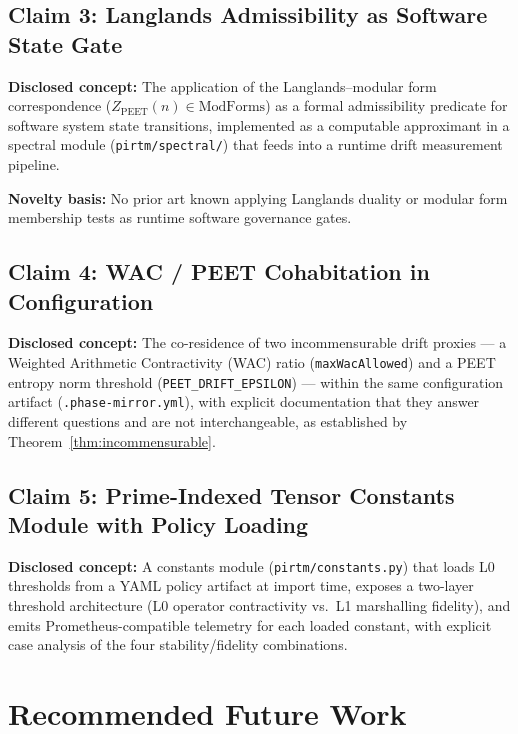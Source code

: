 \documentclass[11pt,letterpaper]{article}
\theoremstyle{definition}
\theoremstyle{remark}
\newcommand{\peet}{\mathrm{PEET}}
\newcommand{\modforms}{\mathrm{ModForms}}
\begin{document}
\subsection{Claim 3: Langlands Admissibility as Software State Gate}

\textbf{Disclosed concept:} The application of the
Langlands--modular form correspondence (\(Z_{\peet}(n) \in \modforms\))
as a formal admissibility predicate for software system state
transitions, implemented as a computable approximant in a spectral
module (\texttt{pirtm/spectral/}) that feeds into a runtime drift
measurement pipeline.

\textbf{Novelty basis:} No prior art known applying Langlands
duality or modular form membership tests as runtime software
governance gates.

\subsection{Claim 4: WAC / PEET Cohabitation in Configuration}

\textbf{Disclosed concept:} The co-residence of two incommensurable
drift proxies --- a Weighted Arithmetic Contractivity (WAC) ratio
(\texttt{maxWacAllowed}) and a PEET entropy norm threshold
(\texttt{PEET\_DRIFT\_EPSILON}) --- within the same configuration
artifact (\texttt{.phase-mirror.yml}), with explicit documentation
that they answer different questions and are not interchangeable,
as established by Theorem~\ref{thm:incommensurable}.

\subsection{Claim 5: Prime-Indexed Tensor Constants Module with Policy Loading}

\textbf{Disclosed concept:} A constants module (\texttt{pirtm/constants.py})
that loads L0 thresholds from a YAML policy artifact at import time,
exposes a two-layer threshold architecture (L0 operator contractivity
vs.\ L1 marshalling fidelity), and emits Prometheus-compatible
telemetry for each loaded constant, with explicit case analysis
of the four stability/fidelity combinations.

\section{Recommended Future Work}
\end{document}
